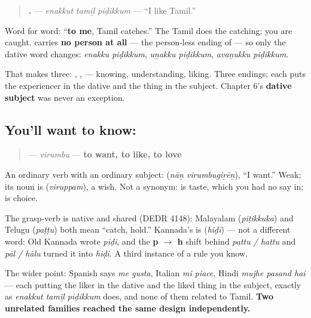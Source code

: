 \begin{grammarlens}[title={Grammar Lens: \ta{எனக்குப்} \ta{பிடிக்கும்}}]
\begin{quote}
\textbf{  .} — \emph{enakkut tamiḻ piḍikkum} — \textquotedblleft{}I like Tamil.\textquotedblright{}
\end{quote}

Word for word: \textquotedblleft{}\textbf{to me}, Tamil catches.\textquotedblright{} The Tamil does the catching; you are caught. \textbf{} carries \textbf{no person at all} — the person-less ending of \textbf{} — so only the dative word changes: \emph{enakku piḍikkum}, \emph{uṉakku piḍikkum}, \emph{avaṉukku piḍikkum}.

That makes three: \textbf{}, \textbf{}, \textbf{} — knowing, understanding, liking. Three endings; each puts the experiencer in the dative and the thing in the subject. Chapter 6's \textbf{dative subject} was never an exception.
\end{grammarlens}

\subsection*{You'll want to know: }
\begin{quote}
\textbf{} — \emph{virumbu} — \textbf{to want, to like, to love}
\end{quote}

An ordinary verb with an ordinary subject: \textbf{ } (\emph{nāṉ virumbugiṟēṉ}), \textquotedblleft{}I want.\textquotedblright{} Weak; its noun is \textbf{} (\emph{viruppam}), a wish. Not a synonym: \textbf{} is taste, which you had no say in; \textbf{} is choice.

\begin{cousinweb}
The grasp-verb is native and shared (DEDR 4148): Malayalam \textbf{} (\emph{piṭikkuka}) and Telugu \textbf{} (\emph{paṭṭu}) both mean \textquotedblleft{}catch, hold.\textquotedblright{} Kannada's is \textbf{} (\emph{hiḍi}) — not a different word: Old Kannada wrote \emph{piḍi}, and the \textbf{p $\to$ h} shift behind \emph{pattu / hattu} and \emph{pāl / hālu} turned it into \emph{hiḍi}. A third instance of a rule you know.

The wider point: Spanish says \emph{me gusta}, Italian \emph{mi piace}, Hindi \emph{mujhe pasand hai} — each putting the liker in the dative and the liked thing in the subject, exactly as \emph{enakkut tamiḻ piḍikkum} does, and none of them related to Tamil. \textbf{Two unrelated families reached the same design independently.}
\end{cousinweb}

